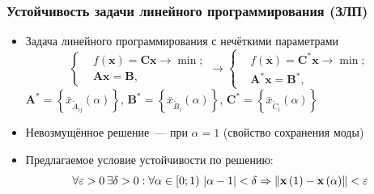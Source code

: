\documentclass[12pt]{beamer}
\begin{document}
\begin{frame}
  \frametitle{Устойчивость задачи линейного программирования (ЗЛП)}
  \begin{itemize}
    \item Задача линейного программирования с нечёткими параметрами
    \begin{equation}
      \label{eq:fuzzy-lp-unstable-problem}
      \left\{ \begin{aligned}
        & f\left( \mathbf{x} \right)=\mathbf{Cx}\to \min;  \\ 
        & \mathbf{Ax}=\mathbf{B},
      \end{aligned} \right.
      \to
      \left\{ \begin{aligned}
        & f\left( \mathbf{x} \right)={\mathbf{C}^{*}}\mathbf{x}\to \min;  \\ 
        & {\mathbf{A}^{*}}\mathbf{x}={\mathbf{B}}^{*},
      \end{aligned} \right.
    \end{equation}
    $\mathbf{A}^{*}=\left\{ \bar{x}_{\tilde{A}_{ij}}\left(\alpha \right) \right\}$, $\mathbf{B}^{*}=\left\{ \bar{x}_{\tilde{B}_i}\left(\alpha \right) \right\}$, $\mathbf{C}^{*}=\left\{ \bar{x}_{\tilde{C}_i}\left(\alpha \right) \right\}$
    \item Невозмущённое решение~--- при $\alpha=1$ (свойство сохранения моды)
    \item Предлагаемое условие устойчивости по решению:
      \begin{equation}
      \label{eq:fuzzy-solution-stability}
        \forall \varepsilon >0\, \exists \delta >0:\forall \alpha \in \left[0; 1\right)\,\left| \alpha -1 \right|<\delta \linebreak \Rightarrow \left\| \mathbf{x}\left( 1 \right)-\mathbf{x}\left( \alpha  \right) \right\|<\varepsilon
      \end{equation}
  \end{itemize}
\end{frame}
\end{document}
